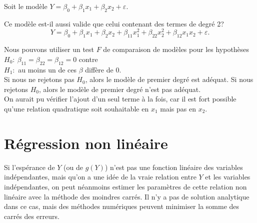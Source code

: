 \begin{exemple}
Soit le modèle
$Y=\beta_0+\beta_1x_{1}+\beta_2x_{2}+\varepsilon.$

Ce modèle est-il aussi valide que celui contenant des termes de degré 2?
$$Y=\beta_0+\beta_1x_{1}+\beta_2x_{2}+\beta_{11}x_{1}^2
+\beta_{22}x_{2}^2+ \beta_{12}x_{1}x_{2}+\varepsilon.$$

Nous pouvons utiliser un test $F$ de comparaison de modèles pour les hypothèses\\
$H_0:\ \beta_{11}=\beta_{22}=\beta_{12}=0$ contre \\
$H_1:$ au moins un de ces $\beta$ diffère de 0. \\

Si nous ne rejetons pas $H_0$, alors le modèle de premier degré est adéquat. Si nous rejetons $H_0$, alors le modèle de premier degré n'est pas adéquat.\\

On aurait pu vérifier l'ajout d'un seul terme à la fois, car il est fort possible qu'une relation quadratique soit souhaitable en $x_1$ mais pas en $x_2$.
\end{exemple}


\newpage

\section{Régression non linéaire}


Si l'espérance de $Y$ (ou de $g(Y)$) n'est pas une fonction linéaire des variables indépendantes, mais qu'on a une idée de la vraie relation entre $Y$ et les variables indépendantes, on peut néanmoins estimer les paramètres de cette relation non linéaire avec la méthode des moindres carrés. Il n'y a pas de solution analytique dans ce cas, mais des  méthodes numériques peuvent minimiser la somme des carrés des erreurs.

